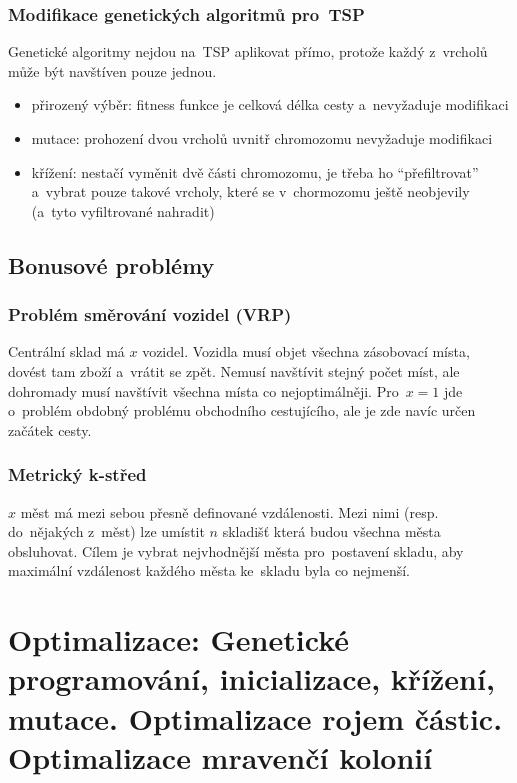 \subsubsection{Modifikace genetických algoritmů pro~TSP}

Genetické algoritmy nejdou na~TSP aplikovat přímo, protože každý z~vrcholů může být navštíven pouze jednou.

\begin{itemize}
    \item přirozený výběr: fitness funkce je celková délka cesty a~nevyžaduje modifikaci
    \item mutace: prohození dvou vrcholů uvnitř chromozomu nevyžaduje modifikaci
    \item křížení: nestačí vyměnit dvě části chromozomu, je třeba ho \enquote{přefiltrovat} a~vybrat pouze takové vrcholy, které se v~chormozomu ještě neobjevily (a~tyto vyfiltrované nahradit)
\end{itemize}

\subsection{Bonusové problémy}

\subsubsection{Problém směrování vozidel (VRP)}

Centrální sklad má $x$ vozidel.
Vozidla musí objet všechna zásobovací místa, dovést tam zboží a~vrátit se zpět.
Nemusí navštívit stejný počet míst, ale dohromady musí navštívit všechna místa co nejoptimálněji.
Pro~$x=1$ jde o~problém obdobný problému obchodního cestujícího, ale je zde navíc určen začátek cesty.

\subsubsection{Metrický k-střed}

$x$ měst má mezi sebou přesně definované vzdálenosti.
Mezi nimi (resp. do~nějakých z~měst) lze umístit $n$ skladišť která budou všechna města obsluhovat.
Cílem je vybrat nejvhodnější města pro~postavení skladu, aby maximální vzdálenost každého města ke~skladu byla co nejmenší.

\clearpage
\section{Optimalizace: Genetické programování, inicializace, křížení, mutace. Optimalizace rojem částic. Optimalizace mravenčí kolonií}

